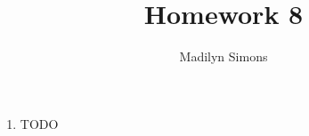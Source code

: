 \documentclass{article}
\title{Homework 8}
\author{Madilyn Simons}
\date{}
\begin{document}
\maketitle

\begin{enumerate}

\item TODO

\end{enumerate}
\end{document}
